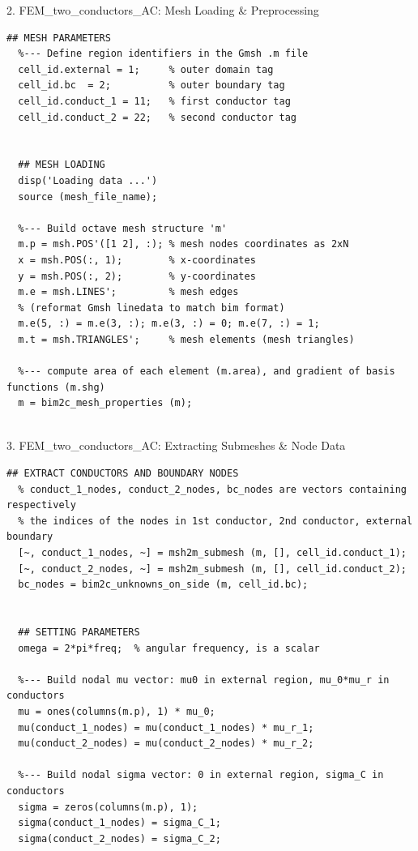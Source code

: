 \documentclass[aspectratio=54,xcolor=dvipsnames]{beamer}
\begin{document}
\begin{frame}[fragile]{2. FEM\_two\_conductors\_AC: Mesh Loading \& Preprocessing}
\scriptsize
\begin{lstlisting}[firstnumber=22]
  ## MESH PARAMETERS
  %--- Define region identifiers in the Gmsh .m file
  cell_id.external = 1;     % outer domain tag
  cell_id.bc  = 2;          % outer boundary tag
  cell_id.conduct_1 = 11;   % first conductor tag
  cell_id.conduct_2 = 22;   % second conductor tag


  ## MESH LOADING
  disp('Loading data ...')
  source (mesh_file_name);

  %--- Build octave mesh structure 'm'
  m.p = msh.POS'([1 2], :); % mesh nodes coordinates as 2xN
  x = msh.POS(:, 1);        % x-coordinates
  y = msh.POS(:, 2);        % y-coordinates
  m.e = msh.LINES';         % mesh edges
  % (reformat Gmsh linedata to match bim format)
  m.e(5, :) = m.e(3, :); m.e(3, :) = 0; m.e(7, :) = 1;
  m.t = msh.TRIANGLES';     % mesh elements (mesh triangles)

  %--- compute area of each element (m.area), and gradient of basis functions (m.shg)
  m = bim2c_mesh_properties (m);
  
\end{lstlisting}
\end{frame}

\begin{frame}[fragile]{3. FEM\_two\_conductors\_AC: Extracting Submeshes \& Node Data}
\scriptsize
\begin{lstlisting}[firstnumber=47]
  ## EXTRACT CONDUCTORS AND BOUNDARY NODES
  % conduct_1_nodes, conduct_2_nodes, bc_nodes are vectors containing respectively
  % the indices of the nodes in 1st conductor, 2nd conductor, external boundary
  [~, conduct_1_nodes, ~] = msh2m_submesh (m, [], cell_id.conduct_1);
  [~, conduct_2_nodes, ~] = msh2m_submesh (m, [], cell_id.conduct_2);
  bc_nodes = bim2c_unknowns_on_side (m, cell_id.bc);


  ## SETTING PARAMETERS
  omega = 2*pi*freq;  % angular frequency, is a scalar

  %--- Build nodal mu vector: mu0 in external region, mu_0*mu_r in conductors
  mu = ones(columns(m.p), 1) * mu_0;
  mu(conduct_1_nodes) = mu(conduct_1_nodes) * mu_r_1;
  mu(conduct_2_nodes) = mu(conduct_2_nodes) * mu_r_2;

  %--- Build nodal sigma vector: 0 in external region, sigma_C in conductors
  sigma = zeros(columns(m.p), 1);
  sigma(conduct_1_nodes) = sigma_C_1;
  sigma(conduct_2_nodes) = sigma_C_2;
  
\end{lstlisting}
\end{frame}
\end{document}
